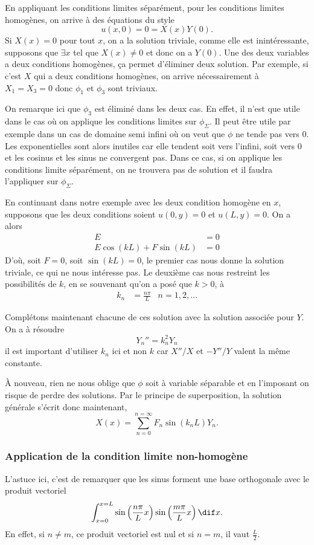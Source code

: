 En appliquant les conditions limites séparément,
pour les conditions limites homogènes,
on arrive à des équations du style
\[ u(x, 0) = 0 = X(x)Y(0). \]
Si $X(x) = 0$ pour tout $x$, on a la solution triviale, comme elle
est inintéressante, supposons que $\exists x$ tel que $X(x) \neq 0$ et donc
on a $Y(0)$.
Une des deux variables a deux conditions homogènes,
ça permet d'éliminer deux solution.
Par exemple, si c'est $X$ qui a deux conditions homogènes,
on arrive nécessairement à $X_1 = X_3 = 0$
donc $\phi_1$ et $\phi_3$ sont triviaux.

On remarque ici que $\phi_3$ est éliminé dans les deux cas.
En effet, il n'est que utile dans le cas où on applique
les conditions limites sur $\phi_\Sigma$.
Il peut être utile par exemple dans un cas de domaine semi infini où
on veut que $\phi$ ne tende pas vers 0.
Les exponentielles sont alors inutiles car elle tendent
soit vers l'infini, soit vers 0
et les cosinus et les sinus ne convergent pas.
Dans ce cas, si on applique les conditions limite séparément,
on ne trouvera pas de solution et il faudra
l'appliquer sur $\phi_\Sigma$.

En continuant dans notre exemple avec les deux
condition homogène en $x$, supposons que les deux
conditions soient $u(0, y) = 0$ et $u(L, y) = 0$.
On a alors
\begin{align*}
  E & = 0\\
  E\cos(kL) + F\sin(kL) & = 0
\end{align*}
D'où, soit $F = 0$, soit $\sin(kL) = 0$, le premier cas nous
donne la solution triviale, ce qui ne nous intéresse pas.
Le deuxième cas nous restreint les possibilités de $k$,
en se souvenant qu'on a posé que $k > 0$, à
\begin{align*}
  k_n & = \frac{n\pi}{L} & n = 1, 2, \ldots
\end{align*}

Complétons maintenant chacune de ces solution avec la solution
associée pour $Y$.
On a à résoudre
\[ Y_n'' = k_n^2Y_n \]
il est important d'utiliser $k_n$ ici et non $k$
car $X''/X$ et $-Y''/Y$ valent la même constante.

À nouveau, rien ne nous oblige que $\phi$ soit à variable
séparable et en l'imposant on risque de perdre des solutions.
Par le principe de superposition,
la solution générale s'écrit donc maintenant,
\[ X(x) = \sum_{n=0}^{n=\infty} F_n \sin(k_nL)Y_n. \]

\subsubsection{Application de la condition limite non-homogène}
L'astuce ici, c'est de remarquer que les sinus
forment une base orthogonale avec le produit vectoriel
\[ \int_{x = 0}^{x = L} \sin\left(\frac{n\pi}{L} x\right)
\sin\left(\frac{m\pi}{L} x\right) \dif x. \]
En effet, si $n \neq m$, ce produit vectoriel est nul et
si $n = m$, il vaut $\frac{L}{2}$.

